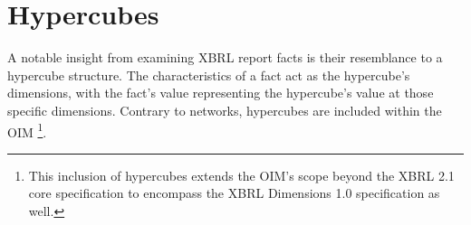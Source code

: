 \section{Hypercubes}
\label{sec:hypercubes}

A notable insight from examining XBRL report facts is their resemblance to a hypercube structure.
The characteristics of a fact act as the hypercube's dimensions, with the fact's value representing the hypercube's value at those specific dimensions.
Contrary to networks, hypercubes are included within the OIM
\footnote{This inclusion of hypercubes extends the OIM's scope beyond the XBRL 2.1 core specification to encompass the XBRL Dimensions 1.0 specification as well.}.



